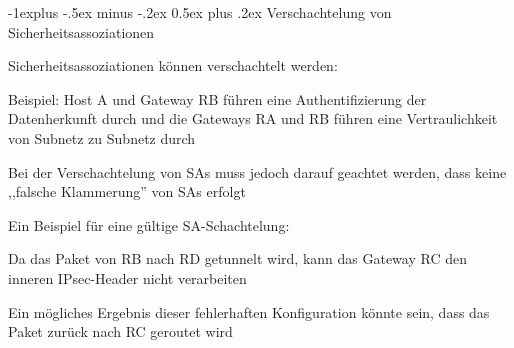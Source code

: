\documentclass[a4paper]{article}
\makeatletter
\renewcommand{\subsection}{\@startsection{subsection}{2}{0mm}%
 {-1explus -.5ex minus -.2ex}%
 {0.5ex plus .2ex}%
 {\normalfont\normalsize\bfseries}}
\makeatother
\begin{document}
\begin{multicols}{3}
      \subsection{Verschachtelung von Sicherheitsassoziationen}
      \begin{itemize*}
            \item Sicherheitsassoziationen können verschachtelt werden:
            \begin{itemize*}
                  \item Beispiel: Host A und Gateway RB führen eine Authentifizierung der Datenherkunft durch und die Gateways RA und RB führen eine Vertraulichkeit von Subnetz zu Subnetz durch
            \end{itemize*}
            \item Bei der Verschachtelung von SAs muss jedoch darauf geachtet werden, dass keine ,,falsche Klammerung'' von SAs erfolgt
            \begin{itemize*}
                  \item Ein Beispiel für eine gültige SA-Schachtelung:
                  \item Da das Paket von RB nach RD getunnelt wird, kann das Gateway RC den inneren IPsec-Header nicht verarbeiten
                  \item Ein mögliches Ergebnis dieser fehlerhaften Konfiguration könnte sein, dass das Paket zurück nach RC geroutet wird
            \end{itemize*}
      \end{itemize*}


\end{multicols}
\end{document}
